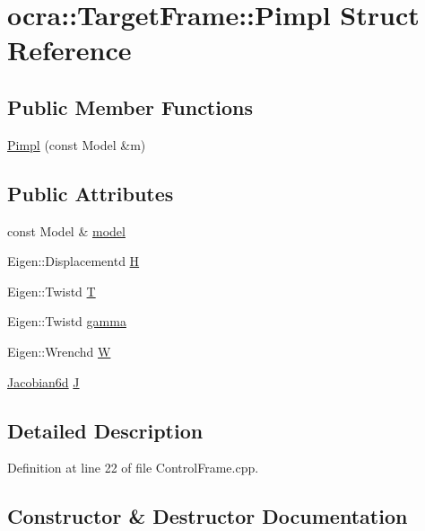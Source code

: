 \hypertarget{structocra_1_1TargetFrame_1_1Pimpl}{}\section{ocra\+:\+:Target\+Frame\+:\+:Pimpl Struct Reference}
\label{structocra_1_1TargetFrame_1_1Pimpl}
\subsection*{Public Member Functions}
\begin{DoxyCompactItemize}
\item 
\hyperlink{structocra_1_1TargetFrame_1_1Pimpl_a01712cd9b98c68bfce55c2edab2cc846}{Pimpl} (const Model \&m)
\end{DoxyCompactItemize}
\subsection*{Public Attributes}
\begin{DoxyCompactItemize}
\item 
const Model \& \hyperlink{structocra_1_1TargetFrame_1_1Pimpl_a7edc0b09f919bb223a44001cdba8dc84}{model}
\item 
Eigen\+::\+Displacementd \hyperlink{structocra_1_1TargetFrame_1_1Pimpl_a84a376863b43fa29115be56fa326d8df}{H}
\item 
Eigen\+::\+Twistd \hyperlink{structocra_1_1TargetFrame_1_1Pimpl_aecb4d2e7692ee0ff9298e8802756e098}{T}
\item 
Eigen\+::\+Twistd \hyperlink{structocra_1_1TargetFrame_1_1Pimpl_a1c9e215a8979352974e88f7606a738b7}{gamma}
\item 
Eigen\+::\+Wrenchd \hyperlink{structocra_1_1TargetFrame_1_1Pimpl_a4ff4bfb5366d48f34539e73fa7b18351}{W}
\item 
\hyperlink{namespaceocra_ac73b015f9f7cb0c252c4d5c4800f559a}{Jacobian6d} \hyperlink{structocra_1_1TargetFrame_1_1Pimpl_afc2a059aca6dc89c5da22b1b86b36922}{J}
\end{DoxyCompactItemize}


\subsection{Detailed Description}


Definition at line 22 of file Control\+Frame.\+cpp.



\subsection{Constructor \& Destructor Documentation}
\hypertarget{structocra_1_1TargetFrame_1_1Pimpl_a01712cd9b98c68bfce55c2edab2cc846}{}\label{structocra_1_1TargetFrame_1_1Pimpl_a01712cd9b98c68bfce55c2edab2cc846} 
